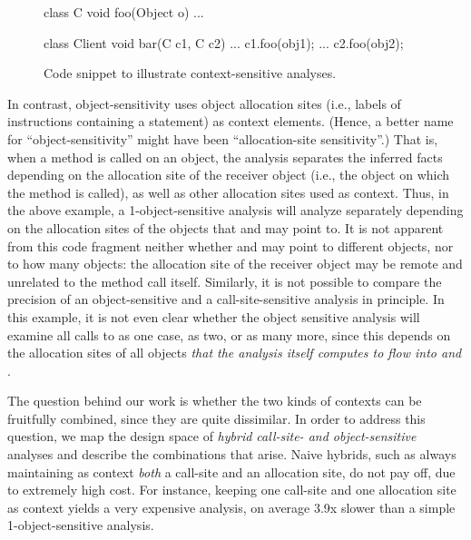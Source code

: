 \begin{figure}[h]
\begin{javacode}
class C {
 void foo(Object o) { ... }
}

class Client {
 void bar(C c1, C c2) { ...
   c1.foo(obj1);
   ...
   c2.foo(obj2);
 }
} 
\end{javacode}
\caption{Code snippet to illustrate context-sensitive analyses.}
\end{figure}

In contrast, object-sensitivity uses object allocation sites (i.e.,
labels of instructions containing a  statement) as context
elements. (Hence, a better name for ``object-sensitivity'' might have
been ``allocation-site sensitivity''.) That is, when a method is
called on an object, the analysis separates the inferred facts
depending on the allocation site of the receiver object (i.e., the
object on which the method is called), as well as other allocation
sites used as context. Thus, in the above example, a
1-object-sensitive analysis will analyze  separately depending
on the allocation sites of the objects that  and  may
point to. It is not apparent from this code fragment neither whether
 and  may point to different objects, nor to how many
objects: the allocation site of the receiver object may be remote and
unrelated to the method call itself. Similarly, it is not possible to
compare the precision of an object-sensitive and a call-site-sensitive
analysis in principle. In this example, it is not even clear whether
the object sensitive analysis will examine all calls to  as
one case, as two, or as many more, since this depends on the
allocation sites of all objects \emph{that the analysis itself computes to
flow into  and }.

The question behind our work is whether the two kinds of contexts can
be fruitfully combined, since they are quite dissimilar. In order to
address this question, we map the design space of \emph{hybrid
  call-site- and object-sensitive} analyses and describe the
combinations that arise. Naive hybrids, such as always maintaining as
context \emph{both} a call-site and an allocation site, do not pay
off, due to extremely high cost. For instance, keeping one call-site
and one allocation site as context yields a very expensive analysis,
on average 3.9x slower than a simple 1-object-sensitive analysis.


